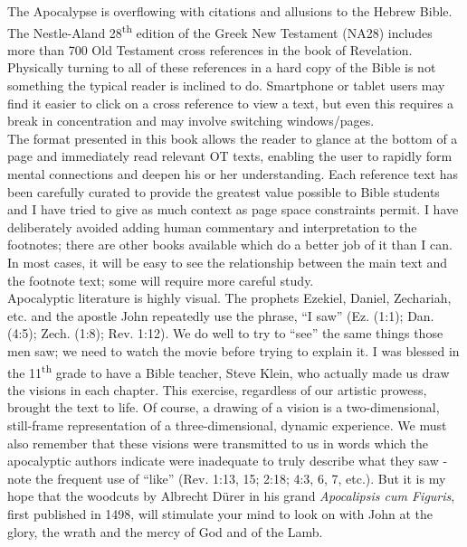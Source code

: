 The Apocalypse is overflowing with citations and allusions to the Hebrew Bible. The Nestle-Aland 28\textsuperscript{th} edition of the Greek New Testament (\textsc{NA28}) includes more than 700 Old Testament cross references in the book of Revelation. Physically turning to all of these references in a hard copy of the Bible is not something the typical reader is inclined to do. Smartphone or tablet users may find it easier to click on a cross reference to view a text, but even this requires a break in concentration and may involve switching windows/pages. \\

The format presented in this book allows the reader to glance at the bottom of a page and immediately read relevant OT texts, enabling the user to rapidly form mental connections and deepen his or her understanding. Each reference text has been carefully curated to provide the greatest value possible to Bible students and I have tried to give as much context as page space constraints permit. I have deliberately avoided adding human commentary and interpretation to the footnotes; there are other books available which do a better job of it than I can. In most cases, it will be easy to see the relationship between the main text and the footnote text; some will require more careful study.\\

Apocalyptic literature is highly visual. The prophets Ezekiel, Daniel, Zechariah, etc. and the apostle John repeatedly use the phrase, ``I saw'' (Ez. (1:1); Dan. (4:5); Zech. (1:8); Rev. 1:12). We do well to try to ``see'' the same things those men saw; we need to watch the movie before trying to explain it. I was blessed in the 11\textsuperscript{th} grade to have a Bible teacher, Steve Klein, who actually made us draw the visions in each chapter. This exercise, regardless of our artistic prowess, brought the text to life. Of course, a drawing of a vision is a two-dimensional, still-frame representation of a three-dimensional, dynamic experience. We must also remember that these visions were transmitted to us in words which the apocalyptic authors indicate were inadequate to truly describe what they saw - note the frequent use of ``like'' (Rev. 1:13, 15; 2:18; 4:3, 6, 7, etc.). But it is my hope that the woodcuts by Albrecht Dürer in his grand \textit{Apocalipsis cum Figuris}, first published in 1498, will stimulate your mind to look on with John at the glory, the wrath and the mercy of God and of the Lamb.\\

